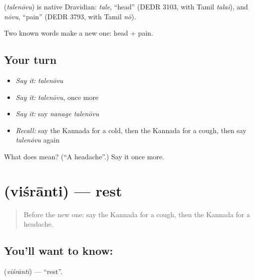 \begin{cousinweb}
\textbf{} (\emph{talenōvu}) is native Dravidian: \emph{tale}, \textquotedblleft{}head\textquotedblright{} (DEDR 3103, with Tamil \emph{talai}), and \emph{nōvu}, \textquotedblleft{}pain\textquotedblright{} (DEDR 3793, with Tamil \emph{nō}).
\end{cousinweb}

\begin{grammarlens}[title={What you've built}]
Two known words make a new one: head + pain.
\end{grammarlens}

\subsection*{Your turn}
\begin{itemize}
\raggedright
  \item \emph{Say it:} \emph{talenōvu}
  \item \emph{Say it:} \emph{talenōvu}, once more
  \item \emph{Say it:} say \emph{nanage talenōvu}
  \item \emph{Recall:} say the Kannada for a cold, then the Kannada for a cough, then say \emph{talenōvu} again
\end{itemize}

\begin{tcolorbox}[breakable,colback=teal!4,colframe=teal!35!black,title={Before you move on}]
What does  mean? (\textquotedblleft{}A headache\textquotedblright{}.) Say it once more.
\end{tcolorbox}
\section[\texorpdfstring{\kn{ವಿಶ್ರಾಂತಿ} (viśrānti)}{ವಿಶ್ರಾಂತಿ (viśrānti)}]{ (viśrānti) — rest}

\label{lesson:KA-C82-rest}



\begin{quote}
Before the new one: say the Kannada for a cough, then the Kannada for a headache.
\end{quote}

\subsection*{You'll want to know: }
\textbf{} (\emph{viśrānti}) — \textquotedblleft{}rest\textquotedblright{}.

